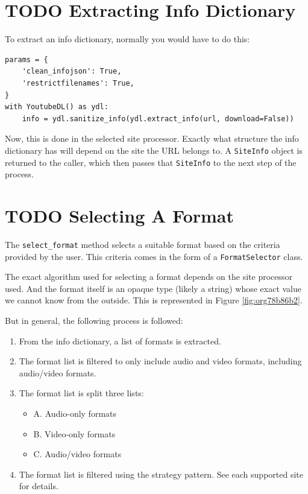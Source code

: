 \documentclass[11pt]{report}
\begin{document}
\section{{\bfseries\sffamily TODO} Extracting Info Dictionary}
\label{sec:org31486ab}
To extract an info dictionary, normally you would have to do this:

\begin{verbatim}
params = {
    'clean_infojson': True,
    'restrictfilenames': True,
}
with YoutubeDL() as ydl:
    info = ydl.sanitize_info(ydl.extract_info(url, download=False))
\end{verbatim}

Now, this is done in the selected site processor.  Exactly what structure the
info dictionary has will depend on the site the URL belongs to.  A \texttt{SiteInfo}
object is returned to the caller, which then passes that \texttt{SiteInfo} to the next
step of the process.

\section{{\bfseries\sffamily TODO} Selecting A Format}
\label{sec:org7a43244}
The \texttt{select\_format} method selects a suitable format based on the criteria
provided by the user.  This criteria comes in the form of a \texttt{FormatSelector}
class.

The exact algorithm used for selecting a format depends on the site processor
used.  And the format itself is an opaque type (likely a string) whose exact
value we cannot know from the outside.  This is represented in Figure \ref{fig:org78b86b2}.

But in general, the following process is followed:
\begin{enumerate}
\item From the info dictionary, a list of formats is extracted.
\item The format list is filtered to only include audio and video formats,
including audio/video formats.
\item The format list is split three lists:
\begin{itemize}
\item A. Audio-only formats
\item B. Video-only formats
\item C. Audio/video formats
\end{itemize}
\item The format list is filtered using the strategy pattern.  See each supported
site for details.
\end{enumerate}
\end{document}
